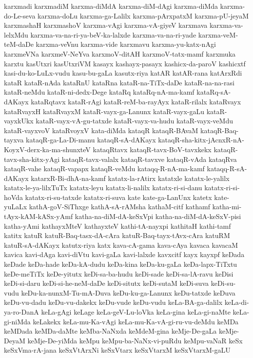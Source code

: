 {karxmadi
karxmadiM
karxma-diMdA
karxma-diM-dAgi
karxma-diMda
karxma-do-Le-seva
karxma-doLu
karxma-ga-Lalilx
karxma-pArxpatxM
karxma-pU-jeyaM
karxmashaH
karxmashoV
karxma-vAgi
karxma-vA-giyeV
karxmava
karxma-va-lelxMdu
karxma-va-na-ri-ya-beV-ka-lalxde
karxma-va-na-ri-yade
karxma-veM-teM-daDe
karxma-veVnu
karxma-vide
karxmavu
karxma-yu-katx-nAgi
karxmeVNa
karxmeV-NeYva
karxmoV-ditAH
karxmoV-tatx-mamf
karxmuka
karxtu
kasUtxri
kasUtxriVM
kasayx
kashayx-pasayx
kashicx-da-paroV
kashicxtf
kasi-du-ko-LuLx-vudu
kasu-bu-gaLa
kasutx-riya
katAR
katAR-rana
katArxRdi
kataR
kataR-nAda
kataRnU
kataRna
kataR-na-TiTx-daDe
kataR-na-na-rasi
kataR-neMdu
kataR-ni-dedx-Dege
kataRq
kataRq-nA-ma-kamf
kataRq-sA-dAKayx
kataRqtavx
kataR-rAgi
kataR-reM-ba-rayAyx
kataR-rilalx
kataRvayx
kataRvayxH
kataRvayxM
kataR-vayx-ga-Lanunx
kataR-vayx-gaLu
kataR-vayxkUkx
kataR-vayx-vA-gu-tatxde
kataR-vayx-va-hudu
kataR-vayx-veMdu
kataR-vayxvoV
kataRvoyxV
kata-diMda
kataqR
kataqR-BAvaM
kataqR-Baq-tayxva
kataqR-ga-La-Di-manu
kataqR-sA-dAKayx
kataqR-sha-kitx-jAcnxR-nA-KoyxV-derx-ka-ma-shunxteV
kataqRtavx
kataqR-tavx-BoV-tavxkekx
kataqR-tavx-sha-kitx-yAgi
kataqR-tavx-valalx
kataqR-tavxve
kataqR-vAda
kataqRva
kataqR-vahe
kataqR-vapapx
kataqR-veMdu
kataqq-R-nA-ma-kamf
kataqq-R-sA-dAKayx
katarxR-Bi-dhA-na-kamf
katatx-la-rAtirx
katatxle
katatx-le-yalilx
katatx-le-ya-lilxTuTx
katatx-leyu
katatx-li-nalilx
katatx-ri-si-danu
katatx-ri-si-hoVda
katatx-ri-su-tatxde
katatx-ri-suva
kate
kate-ga-LanUnx
katetx
kate-yuLaLx
kathA-goV-SiThxge
kathA-sA-rAMsha
kathaM-citf
kathamf
katha-mi-tAyx-kAM-kASx-yAmf
katha-na-diM-dA-keSxVpi
katha-na-diM-dA-keSxV-pisi
katha-yAmi
kathayxMteV
kathayxteV
kathi-tA-nayxpi
kathitaH
kathi-tamf
katitx
katuR
katuR-Baq-tasx-dA-cAra
katuR-Baq-tayx-tAvx-cAra
katuRM
katuR-sA-dAKayx
katutx-riya
katx
kava-cA-gama
kava-cAya
kavaca
kavacaM
kavica
kavi-dAga
kavi-diVtu
kavi-gaLa
kavi-lalxde
kavxcitf
kayx
kayxpf
keDada
keDade
keDa-hade
keDa-kA-dudu
keDa-kina
keDa-ku-gaLa
keDa-lapx-TiTxtu
keDe-meTiTx
keDe-yitutx
keDi-sa-ba-hudu
keDi-sade
keDi-sa-lA-ravu
keDisi
keDi-si-daru
keDi-si-he-neM-daDe
keDi-situtx
keDi-sutaM
keDi-suva
keDi-su-vudu
keDu-ka-nunxM-Tu-mA-Duva
keDu-ku-ga-Lanunx
keDu-tatxde
keDuva
keDu-vu-dadu
keDu-vu-dakekx
keDu-vude
keDu-vudu
keLa-BA-ga-dalilx
keLa-di-ya-ro-DanA
keLa-gAgi
keLage
keLa-geV-Lu-loVka
keLa-gina
keLa-gi-naMte
keLa-gi-niMda
keLakekx
keLa-mu-Ka-vAgi
keLa-mu-Ka-vA-gi-ru-vu-deMdu
keMDa
keMDada
keMDa-daMte
keMba-NaNxda
keMdeM-gina
keMje-De-gaLa
keMje-DeyaM
keMje-De-yiMda
keMpu
keMpu-ba-NaNx-vi-puRdu
keMpu-vaNaR
keSx
keSxVma-rA-jana
keSxVtArxNi
keSxVtarx
keSxVtarxM
keSxVtarxM-gaLU
}
